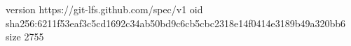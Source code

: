 version https://git-lfs.github.com/spec/v1
oid sha256:6211f53eaf3c5cd1692c34ab50bd9c6cb5cbc2318e14f0414e3189b49a320bb6
size 2755
